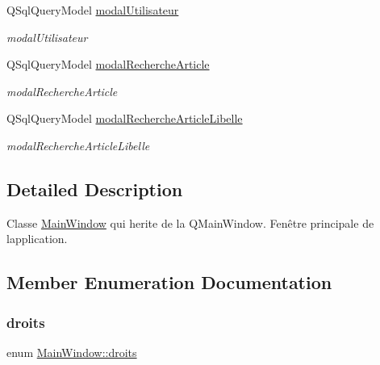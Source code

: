 \begin{DoxyCompactItemize}
\mbox{\label{class_main_window_a75a4302c17bf173dfeb0c8f99bc03073}} 
Q\+Sql\+Query\+Model \mbox{\hyperlink{class_main_window_a75a4302c17bf173dfeb0c8f99bc03073}{modal\+Utilisateur}}
\begin{DoxyCompactList}\small\item\em modal\+Utilisateur \end{DoxyCompactList}\item 
\mbox{\label{class_main_window_a621e251113eb0b964bcea29fcf4860fb}} 
Q\+Sql\+Query\+Model \mbox{\hyperlink{class_main_window_a621e251113eb0b964bcea29fcf4860fb}{modal\+Recherche\+Article}}
\begin{DoxyCompactList}\small\item\em modal\+Recherche\+Article \end{DoxyCompactList}\item 
\mbox{\label{class_main_window_a6bd6bb7b4250626cac80040ee468d9dc}} 
Q\+Sql\+Query\+Model \mbox{\hyperlink{class_main_window_a6bd6bb7b4250626cac80040ee468d9dc}{modal\+Recherche\+Article\+Libelle}}
\begin{DoxyCompactList}\small\item\em modal\+Recherche\+Article\+Libelle \end{DoxyCompactList}\end{DoxyCompactItemize}


\subsection{Detailed Description}
Classe \mbox{\hyperlink{class_main_window}{Main\+Window}} qui herite de la Q\+Main\+Window. Fenêtre principale de l\textquotesingle{}application. 

\subsection{Member Enumeration Documentation}
\mbox{\label{class_main_window_aa16f311e2d64ddecefd3eb2e17cdf800}} 
\subsubsection{\texorpdfstring{droits}{droits}}
{\footnotesize\ttfamily enum \mbox{\hyperlink{class_main_window_aa16f311e2d64ddecefd3eb2e17cdf800}{Main\+Window\+::droits}}}

